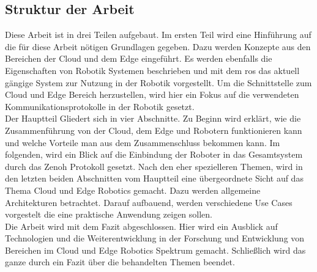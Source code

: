 \subsection{Struktur der Arbeit} %
\label{sub:Struktur der Arbeit}

Diese Arbeit ist in drei Teilen aufgebaut. Im ersten Teil wird eine Hinführung auf die für diese Arbeit nötigen Grundlagen gegeben. Dazu werden Konzepte aus den Bereichen der Cloud und dem Edge eingeführt. Es werden ebenfalls die Eigenschaften von Robotik Systemen beschrieben und mit dem \acrlong{ros} das aktuell gängige System zur Nutzung in der Robotik vorgestellt. Um die Schnittstelle zum Cloud und Edge Bereich herzustellen, wird hier ein Fokus auf die verwendeten Kommunikationsprotokolle in der Robotik gesetzt.\\
Der Hauptteil Gliedert sich in vier Abschnitte. Zu Beginn wird erklärt, wie die Zusammenführung von der Cloud, dem Edge und Robotern funktionieren kann und welche Vorteile man aus dem Zusammenschluss bekommen kann. Im folgenden, wird ein Blick auf die Einbindung der Roboter in das Gesamtsystem durch das Zenoh Protokoll gesetzt. Nach den eher spezielleren Themen, wird in den letzten beiden Abschnitten vom Hauptteil eine übergeordnete Sicht auf das Thema Cloud und Edge Robotics gemacht. Dazu werden allgemeine Architekturen betrachtet. Darauf aufbauend, werden verschiedene Use Cases vorgestelt die eine praktische Anwendung zeigen sollen.\\
Die Arbeit wird mit dem Fazit abgeschlossen. Hier wird ein Ausblick auf Technologien und die Weiterentwicklung in der Forschung und Entwicklung von Bereichen im Cloud und Edge Robotics Spektrum gemacht. Schließlich wird das ganze durch ein Fazit über die behandelten Themen beendet.


